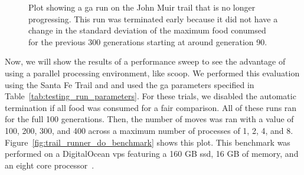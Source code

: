 \begin{figure}[ht]
\centering
{}
\caption[Food Consumed in John Muir Trail on Stuck Run]{Plot showing a \gls{ga} run on the John Muir trail that is no longer progressing. This run was terminated early because it did not have a change in the standard deviation of the maximum food conumsed for the previous 300 generations starting at around generation 90. }
\label{fig:jmt_tr_food_stuck_run}
\end{figure}

\clearpage
Now, we will show the results of a performance sweep to see the advantage of using a parallel processing environment, like \gls{scoop}. We performed this evaluation using the Santa Fe Trail and and used the \gls{ga} parameters specified in Table~\ref{tab:testing_run_parameters}. For these trials, we disabled the automatic termination if all food was consumed for a fair comparison. All of these runs ran for the full 100 generations. Then, the number of moves was ran with a value of 100, 200, 300, and 400 across a maximum number of processes of 1, 2, 4, and 8. Figure~\ref{fig:trail_runner_do_benchmark} shows this plot. This benchmark was performed on a DigitalOcean \gls{vps} featuring a 160 GB \gls{ssd}, 16 GB of memory, and an eight core processor~\cite{DigitalOcean_Inc_undated-bc}.

